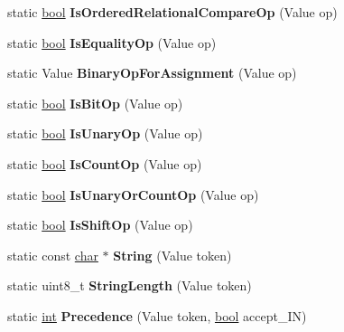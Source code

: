 \begin{DoxyCompactItemize}
\item 
\mbox{\label{classv8_1_1internal_1_1Token_a5374bee5a77c04a854e00e97bd205aa3}} 
static \mbox{\hyperlink{classbool}{bool}} {\bfseries Is\+Ordered\+Relational\+Compare\+Op} (Value op)
\item 
\mbox{\label{classv8_1_1internal_1_1Token_ad7ff5a7e1c7fcce3f0e0543699f4b516}} 
static \mbox{\hyperlink{classbool}{bool}} {\bfseries Is\+Equality\+Op} (Value op)
\item 
\mbox{\label{classv8_1_1internal_1_1Token_a921406413a0efcfc68d832146ea9d414}} 
static Value {\bfseries Binary\+Op\+For\+Assignment} (Value op)
\item 
\mbox{\label{classv8_1_1internal_1_1Token_a95c7a019410d240107ca5d5dfecb696d}} 
static \mbox{\hyperlink{classbool}{bool}} {\bfseries Is\+Bit\+Op} (Value op)
\item 
\mbox{\label{classv8_1_1internal_1_1Token_a835fae2434bcf697c5100399ba6c662f}} 
static \mbox{\hyperlink{classbool}{bool}} {\bfseries Is\+Unary\+Op} (Value op)
\item 
\mbox{\label{classv8_1_1internal_1_1Token_ab9a0e734a80e1d0101a0954891af333d}} 
static \mbox{\hyperlink{classbool}{bool}} {\bfseries Is\+Count\+Op} (Value op)
\item 
\mbox{\label{classv8_1_1internal_1_1Token_a78c6ddf95cea5f7f40fcbfcf023ed1ae}} 
static \mbox{\hyperlink{classbool}{bool}} {\bfseries Is\+Unary\+Or\+Count\+Op} (Value op)
\item 
\mbox{\label{classv8_1_1internal_1_1Token_acecd1f2d38c6527d2a69cd000130c84c}} 
static \mbox{\hyperlink{classbool}{bool}} {\bfseries Is\+Shift\+Op} (Value op)
\item 
\mbox{\label{classv8_1_1internal_1_1Token_a1e4f4756fc0279653182eadc1380e458}} 
static const \mbox{\hyperlink{classchar}{char}} $\ast$ {\bfseries String} (Value token)
\item 
\mbox{\label{classv8_1_1internal_1_1Token_a7d8bd48a5f30ac59203d602b6a4a71e7}} 
static uint8\+\_\+t {\bfseries String\+Length} (Value token)
\item 
\mbox{\label{classv8_1_1internal_1_1Token_adc5afeee112795bad9a6aa81ae9dadd4}} 
static \mbox{\hyperlink{classint}{int}} {\bfseries Precedence} (Value token, \mbox{\hyperlink{classbool}{bool}} accept\+\_\+\+IN)
\end{DoxyCompactItemize}


